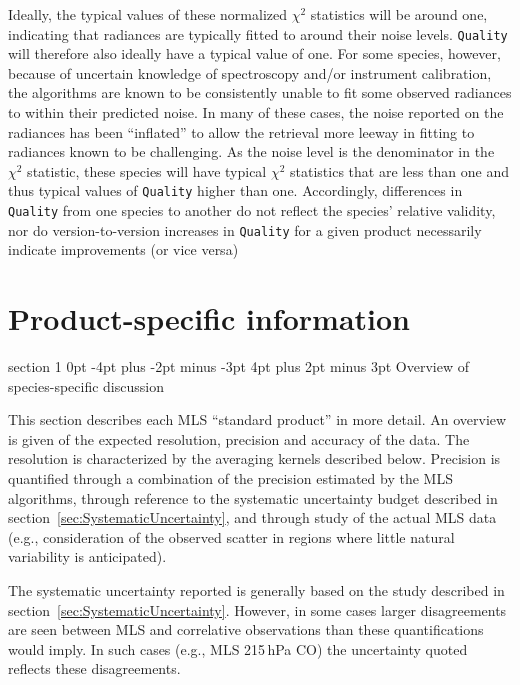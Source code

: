 \documentclass[11pt,draft]{report}
\makeatletter
\renewcommand{\section}{\@startsection%
  {section}%
  {1}%
  {0pt}%
  {-4pt plus -2pt minus -3pt}%
  {4pt plus 2pt minus 3pt}%
  {\Large\sffamily\fontseries{sb}\selectfont\flushleft\color{SectionColor}\figureversion{tabular}}}%
\makeatother
\begin{document}
Ideally, the typical values of these normalized $\chi^2$ statistics will
be around one, indicating that radiances are typically fitted to around
their noise levels.  \texttt{Quality} will therefore also ideally have a
typical value of one.  For some species, however, because of uncertain
knowledge of spectroscopy and/or instrument calibration, the \thisv
algorithms are known to be consistently unable to fit some observed
radiances to within their predicted noise.  In many of these cases, the
noise reported on the radiances has been ``inflated'' to allow the
retrieval more leeway in fitting to radiances known to be challenging.
As the noise level is the denominator in the $\chi^2$ statistic, these
species will have typical $\chi^2$ statistics that are less than one and
thus typical values of \texttt{Quality} higher than one.  Accordingly,
differences in \texttt{Quality} from one species to another do not
reflect the species' relative validity, nor do version-to-version
increases in \texttt{Quality} for a given product necessarily indicate
improvements (or vice versa)

 \chapter{Product-specific information}
\label{chap:Results}


\section{Overview of species-specific discussion}

This section describes each MLS \thisv ``standard product'' in more
detail.  An overview is given of the expected resolution, precision and
accuracy of the data.  The resolution is characterized by the averaging
kernels described below.  Precision is quantified through a combination
of the precision estimated by the MLS \thisv algorithms, through
reference to the systematic uncertainty budget described in
section~\ref{sec:SystematicUncertainty}, and through study of the actual
MLS data (e.g., consideration of the observed scatter in regions where
little natural variability is anticipated).

The systematic uncertainty reported is generally based on the study
described in section~\ref{sec:SystematicUncertainty}.  However, in some
cases larger disagreements are seen between MLS and correlative
observations than these quantifications would imply.  In such cases
(e.g., MLS 215\,hPa CO) the uncertainty quoted reflects these disagreements.
\end{document}
